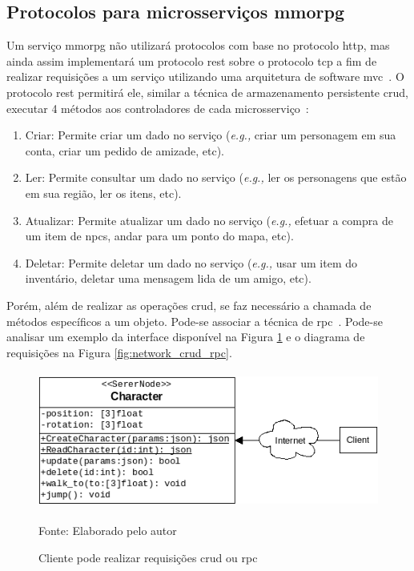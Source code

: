 \subsection{Protocolos para microsserviços \ac{mmorpg}}



Um serviço \ac{mmorpg} não utilizará protocolos com base no protocolo \ac{http}, mas ainda assim implementará um protocolo \ac{rest} sobre o protocolo \ac{tcp} a fim de realizar requisições a um serviço utilizando uma arquitetura de software \ac{mvc}~\cite{Chadwick2012Oct, LeckyThompson2008Nov}.
%
O protocolo \ac{rest} permitirá ele, similar a técnica de armazenamento persistente \ac{crud}, executar 4 métodos aos controladores de cada microsserviço~\cite{6267019}:



\begin{enumerate}
  \item Criar: Permite criar um dado no serviço (\textit{e.g.,} criar um personagem em sua conta, criar um pedido de amizade, etc).
  \item Ler: Permite consultar um dado no serviço (\textit{e.g.,} ler os personagens que estão em sua região, ler os itens, etc).
  \item Atualizar: Permite atualizar um dado no serviço (\textit{e.g.,} efetuar a compra de um item de \ac{npcs}, andar para um ponto do mapa, etc).
  \item Deletar: Permite deletar um dado no serviço (\textit{e.g.,} usar um item do inventário, deletar uma mensagem lida de um amigo, etc).
\end{enumerate}



Porém, além de realizar as operações \ac{crud}, se faz necessário a chamada de métodos específicos a um objeto.
%
Pode-se associar a técnica de \ac{rpc}~\cite{LeckyThompson2008Nov}. Pode-se analisar um exemplo da interface disponível na Figura \ref{fig:crud_rpc} e o diagrama de requisições na Figura \ref{fig:network_crud_rpc}.



\begin{figure}[htb!]
\caption{Cliente pode realizar requisições \ac{crud} ou \ac{rpc}}
\label{fig:crud_rpc}
\includegraphics[height=4.5cm]{img/cap2/crud_rpc.png}
\centering

Fonte: Elaborado pelo autor
\end{figure}



